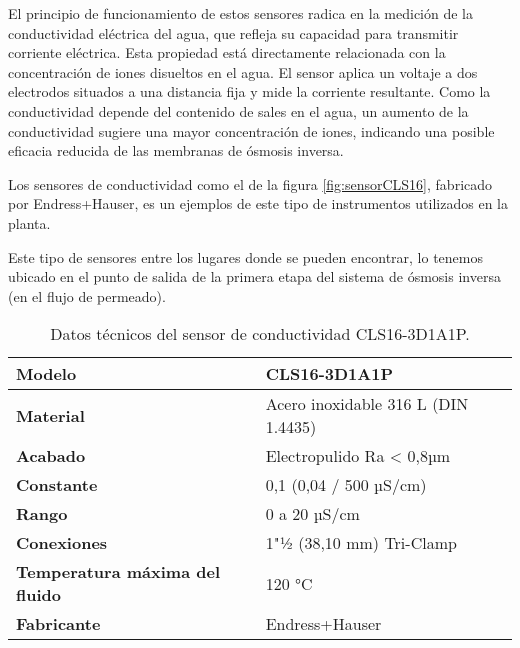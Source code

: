El principio de funcionamiento de estos sensores radica en la medición de la conductividad eléctrica del agua,
que refleja su capacidad para transmitir corriente eléctrica. Esta propiedad está directamente relacionada
con la concentración de iones disueltos en el agua. El sensor aplica un voltaje a dos electrodos situados a una
distancia fija y mide la corriente resultante. Como la conductividad depende del contenido de sales en el agua,
un aumento de la conductividad sugiere una mayor concentración de iones, indicando una posible eficacia reducida
de las membranas de ósmosis inversa.

Los sensores de conductividad como el de la figura \ref{fig:sensorCLS16}, fabricado por Endress+Hauser, es un  ejemplos de este tipo de
instrumentos utilizados en la planta.


Este tipo de sensores entre los lugares donde se pueden encontrar, lo tenemos ubicado en el punto de salida de la primera
etapa del sistema de ósmosis inversa (en el flujo de permeado).


\renewcommand{\arraystretch}{2}
\begin{table}[H]
    \centering
    \caption{Datos técnicos del sensor de conductividad CLS16-3D1A1P.}
    \label{table:sensorCLS16}
    \begin{tabular}{| L{6cm} | L{6cm} |}
        \hline
        \textbf{Modelo}                        & CLS16-3D1A1P                        \\
        \hline
        \textbf{Material}                      & Acero inoxidable 316 L (DIN 1.4435) \\
        \hline
        \textbf{Acabado}                       & Electropulido Ra < 0,8µm            \\
        \hline
        \textbf{Constante}                     & 0,1 (0,04 / 500 µS/cm)              \\
        \hline
        \textbf{Rango}                         & 0 a 20 µS/cm                        \\
        \hline
        \textbf{Conexiones}                    & 1"½ (38,10 mm) Tri-Clamp            \\
        \hline
        \textbf{Temperatura máxima del fluido} & 120 °C                              \\
        \hline
        \textbf{Fabricante}                    & Endress+Hauser                      \\
        \hline
    \end{tabular}
\end{table}




